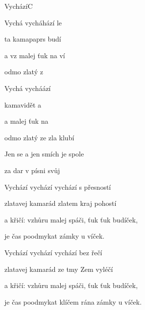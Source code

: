\begin{song}{Vychází}{C}{}
\begin{SBVerse}
Vychá vycháhází  le

ta kamapaprs budí 

a  vz malej   ťuk na ví

odmo zlatý  z 

Vychá vycháází  

 kamavidět  a 

a   malej   ťuk na 

odmo zlatý  ze zla klubí
\end{SBVerse}
\begin{SBChorus}
Jen se a jen  smích je  spole

  za dar  v písni  svůj 
\end{SBChorus}
\begin{SBVerse}
Vychází vychází vychází s přesností

zlatavej kamarád zlatem kraj pohostí

a křičí: vzhůru malej spáči, ťuk ťuk budíček,

je čas poodmykat zámky u víček.

Vychází vychází vychází bez řečí

zlatavej kamarád ze tmy Zem vyléčí

a křičí: vzhůru malej spáči, ťuk ťuk budíček,

je čas poodmykat klíčem rána zámky u víček.
\end{SBVerse}
\end{song}